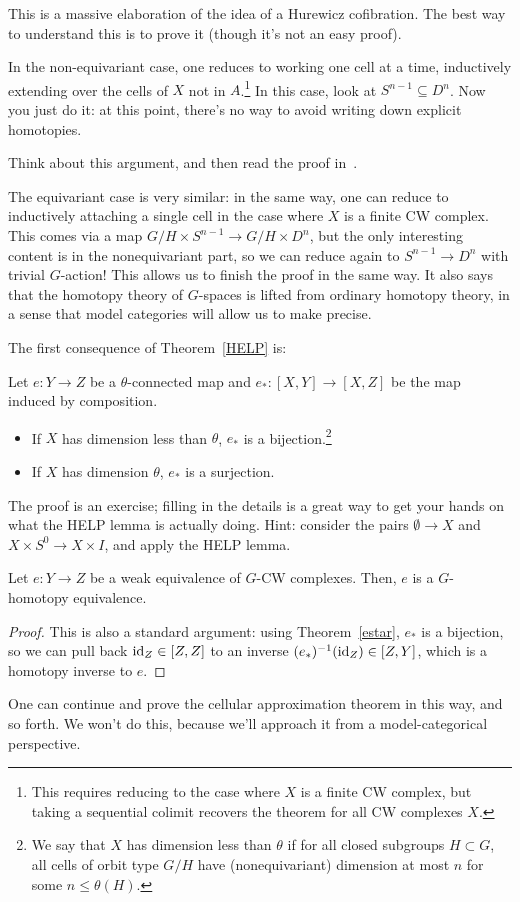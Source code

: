 This is a massive elaboration of the idea of a Hurewicz cofibration. The best way to understand this is to prove
it (though it's not an easy proof).

In the non-equivariant case, one reduces to working one cell at a time, inductively extending over the cells of $X$
not in $A$.\footnote{This requires reducing to the case where $X$ is a finite CW complex, but taking a sequential
colimit recovers the theorem for all CW complexes $X$.} In this case, look at $S^{n-1}\subseteq D^n$. Now you just
do it: at this point, there's no way to avoid writing down explicit homotopies.
\begin{ex}
Think about this argument, and then read the proof in~\cite{ConciseCourse}.
\end{ex}
The equivariant case is very similar: in the same way, one can reduce to inductively attaching a single cell in the
case where $X$ is a finite CW complex. This comes via a map $G/H\times S^{n-1}\to G/H\times D^n$, but the only
interesting content is in the nonequivariant part, so we can reduce again to $S^{n-1}\to D^n$ with trivial
$G$-action! This allows us to finish the proof in the same way. It also says that the homotopy theory of $G$-spaces
is lifted from ordinary homotopy theory, in a sense that model categories will allow us to make precise.

The first consequence of Theorem~\ref{HELP} is:
\begin{thm}
\label{estar}
Let $e:Y\to Z$ be a $\theta$-connected map and $e_*: [X,Y]\to [X,Z]$ be the map induced by composition.
\begin{itemize}
	\item If $X$ has dimension less than $\theta$, $e_*$ is a bijection.\footnote{We say that $X$ has dimension
	less than $\theta$ if for all closed subgroups $H\subset G$, all cells of orbit type $G/H$ have
	(nonequivariant) dimension at most $n$ for some $n \leq \theta(H)$.}
	\item If $X$ has dimension $\theta$, $e_*$ is a surjection.
\end{itemize}
\end{thm}
The proof is an exercise; filling in the details is a great way to get your hands on what the HELP lemma is
actually doing. Hint: consider the pairs $\emptyset\to X$ and $X\times S^0\to X\times I$, and apply the HELP lemma.
\begin{cor}
\label{eqWhite}
Let $e:Y\to Z$ be a weak equivalence of $G$-CW complexes. Then, $e$ is a $G$-homotopy equivalence.
\end{cor}
\begin{proof}
This is also a standard argument: using Theorem~\ref{estar}, $e_*$ is a bijection, so we can pull back
$\mathrm{id}_Z\in[Z,Z]$ to an inverse $(e_*)^{-1}(\mathrm{id}_Z)\in [Z,Y]$, which is a homotopy inverse to $e$.
\end{proof}
One can continue and prove the cellular approximation theorem in this way, and so forth. We won't do this, because
we'll approach it from a model-categorical perspective.

